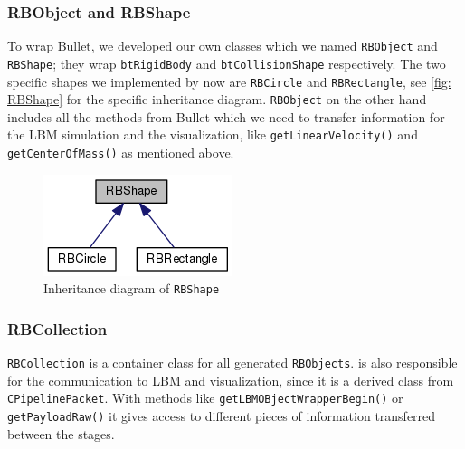 \subsubsection*{RBObject and RBShape}
To wrap Bullet, we developed our own classes which we named \texttt{RBObject} and \texttt{RBShape}; they wrap \texttt{btRigidBody} and \texttt{btCollisionShape} respectively. The two specific shapes we implemented by now are \texttt{RBCircle} and \texttt{RBRectangle}, see \autoref{fig: RBShape} for the specific inheritance diagram.  
\texttt{RBObject} on the other hand includes all the methods from Bullet which we need to transfer information for the LBM simulation and the visualization, like \texttt{getLinearVelocity()} and \texttt{getCenterOfMass()} as mentioned above. 
\begin{figure}[ht]
\centering
\includegraphics[scale=0.5]{img/RigidBodies/RBShapeGraph.png}
\caption{Inheritance diagram of \texttt{RBShape}}
\label{fig: RBShape}
\end{figure}

\subsubsection*{RBCollection}
\texttt{RBCollection} is a container class for all generated \texttt{RBObjects}. is also responsible for the communication to LBM and visualization, since it is a derived class from \texttt{CPipelinePacket}. With methods like \texttt{getLBMOBjectWrapperBegin()} or \texttt{getPayloadRaw()} it gives access to different pieces of information transferred between the stages. 

